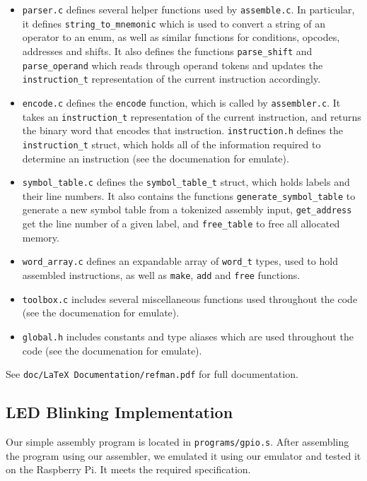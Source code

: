 \documentclass[10pt]{article}
\begin{document}
\begin{itemize}
\item \texttt{parser.c} defines several helper functions used by \texttt{assemble.c}. In particular, it defines \texttt{string\_to\_mnemonic} which is used to convert a string of an operator to an enum, as well as similar functions for conditions, opcodes, addresses and shifts. It also defines the functions \texttt{parse\_shift} and \texttt{parse\_operand} which reads through operand tokens and updates the \texttt{instruction\_t} representation of the current instruction accordingly.
\item \texttt{encode.c} defines the \texttt{encode} function, which is called by \texttt{assembler.c}. It takes an \texttt{instruction\_t} representation of the current instruction, and returns the binary word that encodes that instruction. \texttt{instruction.h} defines the \texttt{instruction\_t} struct, which holds all of the information required to determine an instruction (see the documenation for emulate).
\item \texttt{symbol\_table.c} defines the \texttt{symbol\_table\_t} struct, which holds labels and their line numbers. It also contains the functions \texttt{generate\_symbol\_table} to generate a new symbol table from a tokenized assembly input, \texttt{get\_address} get the line number of a given label, and \texttt{free\_table} to free all allocated memory.
\item \texttt{word\_array.c} defines an expandable array of \texttt{word\_t} types, used to hold assembled instructions, as well as \texttt{make}, \texttt{add} and \texttt{free} functions.
\item \texttt{toolbox.c} includes several miscellaneous functions used throughout the code (see the documenation for emulate). 
\item \texttt{global.h} includes constants and type aliases which are used throughout the code (see the documenation for emulate).
\end{itemize}

See \texttt{doc/LaTeX Documentation/refman.pdf} for full documentation.

\subsection{LED Blinking Implementation}

Our simple assembly program is located in \texttt{programs/gpio.s}. After assembling the program using our assembler, we emulated it using our emulator and tested it on the Raspberry Pi. It meets the required specification.
\end{document}
